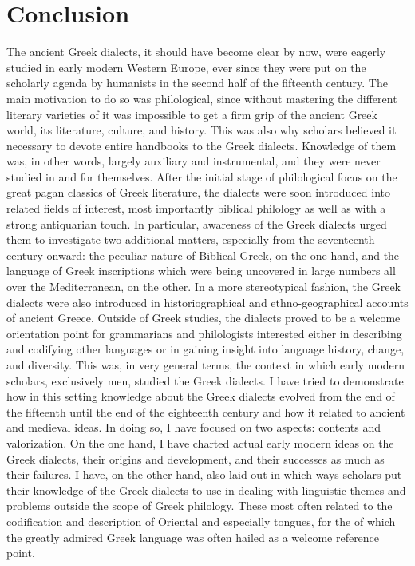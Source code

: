 \chapter{Conclusion} \label{chap:9}

The ancient Greek dialects, it should have become clear by now, were eagerly studied in early modern Western Europe, ever since they were put on the scholarly agenda by humanists in the second half of the fifteenth century. The main motivation to do so was philological, since without mastering the different literary varieties of  it was impossible to get a firm grip of the ancient Greek world, its literature, culture, and history. This was also why scholars believed it necessary to devote entire handbooks to the Greek dialects. Knowledge of them was, in other words, largely auxiliary and instrumental, and they were never studied in and for themselves. After the initial stage of philological focus on the great pagan classics of Greek literature, the dialects were soon introduced into related fields of interest, most importantly biblical philology as well as  with a strong antiquarian touch. In particular, awareness of the Greek dialects urged them to investigate two additional matters, especially from the seventeenth century onward: the peculiar nature of Biblical Greek, on the one hand, and the language of Greek inscriptions which were being uncovered in large numbers all over the Mediterranean, on the other. In a more stereotypical fashion, the Greek dialects were also introduced in historiographical and ethno-geographical accounts of ancient Greece. Outside of Greek studies, the dialects proved to be a welcome orientation point for grammarians and philologists interested either in describing and codifying other languages or in gaining insight into language history, change, and diversity. This was, in very general terms, the context in which early modern scholars, exclusively men, studied the Greek dialects. I have tried to demonstrate how in this setting knowledge about the Greek dialects evolved from the end of the fifteenth until the end of the eighteenth century and how it related to ancient and medieval ideas. In doing so, I have focused on two aspects: contents and valorization. On the one hand, I have charted actual early modern ideas on the Greek dialects, their origins and development, and their successes as much as their failures. I have, on the other hand, also laid out in which ways scholars put their knowledge of the Greek dialects to use in dealing with linguistic themes and problems outside the scope of Greek philology. These most often related to the codification and description of Oriental and especially  tongues, for the  of which the greatly admired Greek language was often hailed as a welcome reference point.

